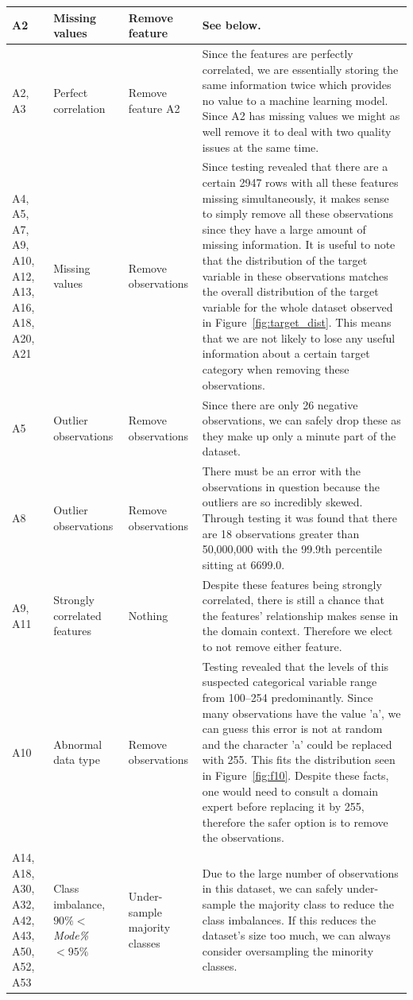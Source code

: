 \documentclass[11pt]{article}
\begin{document}
\begin{longtable}{|p{1.7cm}|p{4cm}|p{3cm}|p{6cm}|}
	\hline
	\endlastfoot
	A2 & Missing values & Remove feature & See below. \\ \hline
	A2, A3 & Perfect correlation & Remove feature A2 & Since the features are perfectly correlated, we are essentially storing the same information twice which provides no value to a machine learning model. Since A2 has missing values we might as well remove it to deal with two quality issues at the same time. \\ \hline
	A4, A5, A7, A9, A10, A12, A13, A16, A18, A20, A21 & Missing values & Remove observations & Since testing revealed that there are a certain 2947 rows with all these features missing simultaneously, it makes sense to simply remove all these observations since they have a large amount of missing information. It is useful to note that the distribution of the target variable in these observations matches the overall distribution of the target variable for the whole dataset observed in Figure~\ref{fig:target_dist}. This means that we are not likely to lose any useful information about a certain target category when removing these observations.  \\ \hline
	A5 & Outlier observations & Remove observations & Since there are only 26 negative observations, we can safely drop these as they make up only a minute part of the dataset. \\
	\hline
	A8 & Outlier observations & Remove observations & There must be an error with the observations in question because the outliers are so incredibly skewed. Through testing it was found that there are 18 observations greater than 50,000,000 with the 99.9th percentile sitting at 6699.0. \\ \hline
	A9, A11 & Strongly correlated features & Nothing & Despite these features being strongly correlated, there is still a chance that the features' relationship makes sense in the domain context. Therefore we elect to not remove either feature.\\ \hline
	A10 & Abnormal data type & Remove observations & Testing revealed that the levels of this suspected categorical variable range from 100–254 predominantly. Since many observations have the value 'a', we can guess this error is not at random and the character 'a' could be replaced with 255. This fits the distribution seen in Figure~\ref{fig:f10}. Despite these facts, one would need to consult a domain expert before replacing it by 255, therefore the safer option is to remove the observations. \\ \hline
	A14, A18, A30, A32, A42, A43, A50, A52, A53 & Class imbalance, $90\%<$\textit{Mode\%} $< 95\%$ & Under-sample majority classes & Due to the large number of observations in this dataset, we can safely under-sample the majority class to reduce the class imbalances. If this reduces the dataset's size too much, we can always consider oversampling the minority classes. \\ \hline

\end{longtable}
\end{document}
